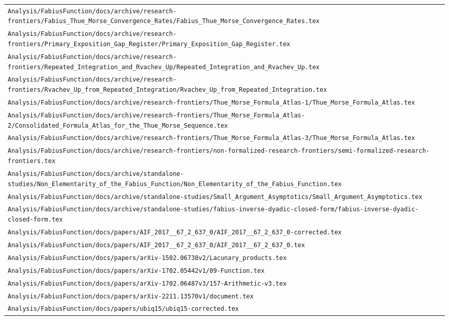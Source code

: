 \begin{longtable}{@{}p{\textwidth}@{}}
\nolinkurl{Analysis/FabiusFunction/docs/archive/research-frontiers/Fabius_Thue_Morse_Convergence_Rates/Fabius_Thue_Morse_Convergence_Rates.tex}\\[0.12em]
\nolinkurl{Analysis/FabiusFunction/docs/archive/research-frontiers/Primary_Exposition_Gap_Register/Primary_Exposition_Gap_Register.tex}\\[0.12em]
\nolinkurl{Analysis/FabiusFunction/docs/archive/research-frontiers/Repeated_Integration_and_Rvachev_Up/Repeated_Integration_and_Rvachev_Up.tex}\\[0.12em]
\nolinkurl{Analysis/FabiusFunction/docs/archive/research-frontiers/Rvachev_Up_from_Repeated_Integration/Rvachev_Up_from_Repeated_Integration.tex}\\[0.12em]
\nolinkurl{Analysis/FabiusFunction/docs/archive/research-frontiers/Thue_Morse_Formula_Atlas-1/Thue_Morse_Formula_Atlas.tex}\\[0.12em]
\nolinkurl{Analysis/FabiusFunction/docs/archive/research-frontiers/Thue_Morse_Formula_Atlas-2/Consolidated_Formula_Atlas_for_the_Thue_Morse_Sequence.tex}\\[0.12em]
\nolinkurl{Analysis/FabiusFunction/docs/archive/research-frontiers/Thue_Morse_Formula_Atlas-3/Thue_Morse_Formula_Atlas.tex}\\[0.12em]
\nolinkurl{Analysis/FabiusFunction/docs/archive/research-frontiers/non-formalized-research-frontiers/semi-formalized-research-frontiers.tex}\\[0.12em]
\nolinkurl{Analysis/FabiusFunction/docs/archive/standalone-studies/Non_Elementarity_of_the_Fabius_Function/Non_Elementarity_of_the_Fabius_Function.tex}\\[0.12em]
\nolinkurl{Analysis/FabiusFunction/docs/archive/standalone-studies/Small_Argument_Asymptotics/Small_Argument_Asymptotics.tex}\\[0.12em]
\nolinkurl{Analysis/FabiusFunction/docs/archive/standalone-studies/fabius-inverse-dyadic-closed-form/fabius-inverse-dyadic-closed-form.tex}\\[0.12em]
\nolinkurl{Analysis/FabiusFunction/docs/papers/AIF_2017__67_2_637_0/AIF_2017__67_2_637_0-corrected.tex}\\[0.12em]
\nolinkurl{Analysis/FabiusFunction/docs/papers/AIF_2017__67_2_637_0/AIF_2017__67_2_637_0.tex}\\[0.12em]
\nolinkurl{Analysis/FabiusFunction/docs/papers/arXiv-1502.06738v2/Lacunary_products.tex}\\[0.12em]
\nolinkurl{Analysis/FabiusFunction/docs/papers/arXiv-1702.05442v1/09-Function.tex}\\[0.12em]
\nolinkurl{Analysis/FabiusFunction/docs/papers/arXiv-1702.06487v3/157-Arithmetic-v3.tex}\\[0.12em]
\nolinkurl{Analysis/FabiusFunction/docs/papers/arXiv-2211.13570v1/document.tex}\\[0.12em]
\nolinkurl{Analysis/FabiusFunction/docs/papers/ubiq15/ubiq15-corrected.tex}\\[0.12em]
\end{longtable}
\endgroup
